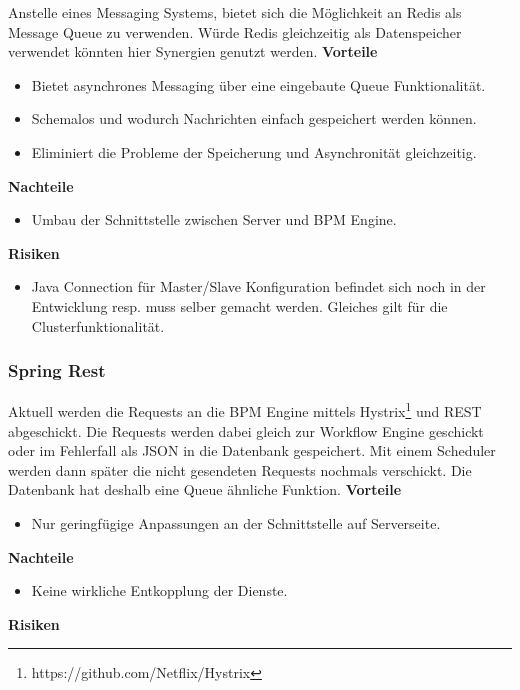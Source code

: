 Anstelle eines Messaging Systems, bietet sich die Möglichkeit an Redis als Message Queue zu verwenden. Würde Redis gleichzeitig als Datenspeicher verwendet könnten hier Synergien genutzt werden. 
\newline
\newline
\textbf{Vorteile}
\begin{itemize}
	\item Bietet asynchrones Messaging über eine eingebaute Queue Funktionalität.
	\item Schemalos und wodurch Nachrichten einfach gespeichert werden können.
	\item Eliminiert die Probleme der Speicherung und Asynchronität gleichzeitig.
\end{itemize}
\textbf{Nachteile}
\begin{itemize}
	\item Umbau der Schnittstelle zwischen Server und BPM Engine.
\end{itemize}
\textbf{Risiken}
\begin{itemize}
	\item Java Connection für Master/Slave Konfiguration befindet sich noch in der Entwicklung resp. muss selber gemacht werden. Gleiches gilt für die Clusterfunktionalität.
\end{itemize}

\subsubsection{Spring Rest}

Aktuell werden die Requests an die BPM Engine mittels Hystrix\footnote{https://github.com/Netflix/Hystrix} und \gls{REST} abgeschickt. Die Requests werden dabei gleich zur Workflow Engine geschickt oder im Fehlerfall als JSON in die Datenbank gespeichert. Mit einem Scheduler werden dann später die nicht gesendeten Requests nochmals verschickt. Die Datenbank hat deshalb eine Queue ähnliche Funktion.
\newline
\newline
\textbf{Vorteile}
\begin{itemize}
	\item Nur geringfügige Anpassungen an der Schnittstelle auf Serverseite.
\end{itemize}
\textbf{Nachteile}
\begin{itemize}
	\item Keine wirkliche Entkopplung der Dienste.
\end{itemize}
\textbf{Risiken}

